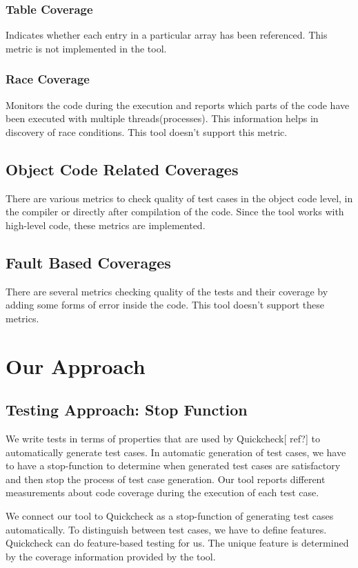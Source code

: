 \documentclass[12pt,a4paper]{report}
\begin{document}
\subsection{Table Coverage}
Indicates whether each entry in a particular array has been referenced.\cite{andersson2005automatic}
This metric is not implemented in the tool.

\subsection{Race Coverage}
Monitors the code during the execution and reports which parts of the code have been executed with multiple threads(processes). This information helps in
 discovery of race conditions. This tool doesn't support this metric.

\section{Object Code Related Coverages}
There are various metrics to check quality of test cases in the object code level, in the compiler or directly after compilation of the code. Since the tool
 works with high-level code, these metrics are implemented.

\section{Fault Based Coverages}
There are several metrics checking quality of the tests and their coverage by adding some forms of error inside the code. This tool doesn't support these
 metrics.

\chapter{Our Approach}
\newpage
\section{Testing Approach: Stop Function}
We write tests in terms of properties that are used by Quickcheck[ ref?] to automatically generate test cases. In automatic generation of test cases, we
 have to have a stop-function to determine when generated test cases are satisfactory and then stop the process of test case generation. Our tool reports
 different measurements about code coverage during the execution of each test case. 

We connect our tool to Quickcheck as a stop-function of generating test cases automatically. To distinguish between test cases, we have to define features.
 Quickcheck can do feature-based testing for us. The unique feature is determined by the coverage information provided by the tool.
\end{document}
